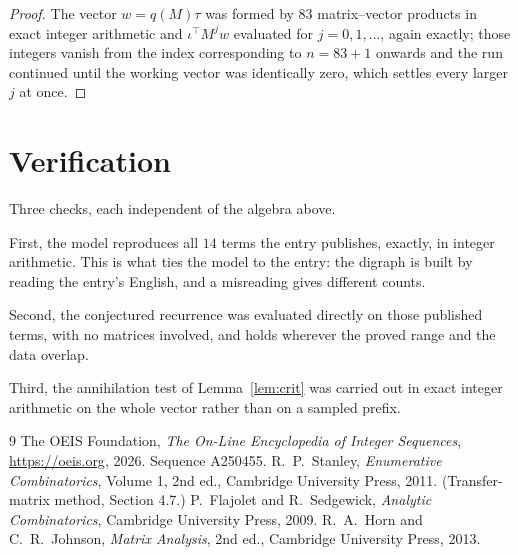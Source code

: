 \documentclass[11pt,a4paper]{article}
\theoremstyle{plain}
\theoremstyle{definition}
\begin{document}
\begin{proof}
The vector $w=q(M)\tau$ was formed by $83$ matrix--vector products in exact integer
arithmetic and $\iota^{\!\top}M^{j}w$ evaluated for $j=0,1,\dots$, again exactly; those
integers vanish from the index corresponding to $n=83+1$ onwards and the run continued
until the working vector was identically zero, which settles every larger $j$ at once.
\end{proof}

\section{Verification}

Three checks, each independent of the algebra above.

First, the model reproduces all $14$ terms the entry publishes, exactly, in integer
arithmetic. This is what ties the model to the entry: the digraph is built by reading the
entry's English, and a misreading gives different counts.

Second, the conjectured recurrence was evaluated directly on those published terms, with no
matrices involved, and holds wherever the proved range and the data overlap.

Third, the annihilation test of Lemma~\ref{lem:crit} was carried out in exact integer
arithmetic on the whole vector rather than on a sampled prefix.

\begin{thebibliography}{9}
 The OEIS Foundation, \emph{The On-Line Encyclopedia of Integer
Sequences}, \url{https://oeis.org}, 2026. Sequence A250455.
 R.~P.~Stanley, \emph{Enumerative Combinatorics}, Volume 1, 2nd ed.,
Cambridge University Press, 2011. (Transfer-matrix method, Section 4.7.)
 P.~Flajolet and R.~Sedgewick, \emph{Analytic Combinatorics}, Cambridge
University Press, 2009.
 R.~A.~Horn and C.~R.~Johnson, \emph{Matrix Analysis}, 2nd ed., Cambridge
University Press, 2013.
\end{thebibliography}
\end{document}
